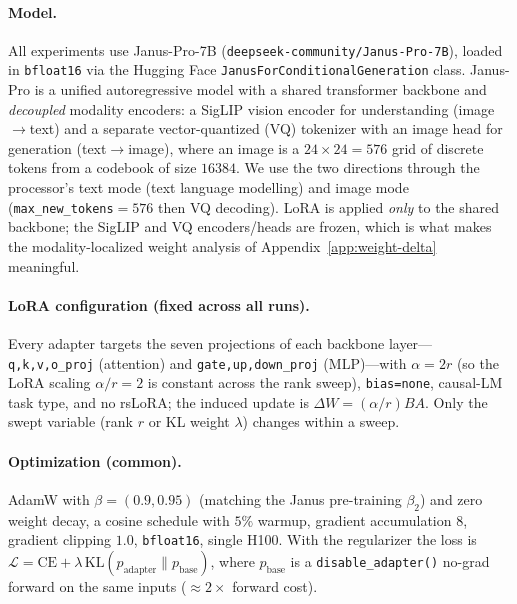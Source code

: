 \documentclass{article}
\begin{document}
\paragraph{Model.}
All experiments use Janus-Pro-7B (\texttt{deepseek-community/Janus-Pro-7B}),
loaded in \texttt{bfloat16} via the Hugging Face
\texttt{JanusForConditionalGeneration} class. Janus-Pro is a unified
autoregressive model with a shared transformer backbone and \emph{decoupled}
modality encoders: a SigLIP vision encoder for understanding (image$\to$text) and
a separate vector-quantized (VQ) tokenizer with an image head for generation
(text$\to$image), where an image is a $24\times24=576$ grid of discrete tokens
from a codebook of size $16384$. We use the two directions through the
processor's text mode (text language modelling) and image mode
(\texttt{max\_new\_tokens}$=576$ then VQ decoding). LoRA is applied \emph{only} to
the shared backbone; the SigLIP and VQ encoders/heads are frozen, which is what
makes the modality-localized weight analysis of Appendix~\ref{app:weight-delta}
meaningful.

\paragraph{LoRA configuration (fixed across all runs).}
Every adapter targets the seven projections of each backbone layer---%
\texttt{q,k,v,o\_proj} (attention) and \texttt{gate,up,down\_proj} (MLP)---with
$\alpha=2r$ (so the LoRA scaling $\alpha/r=2$ is constant across the rank sweep),
\texttt{bias=none}, causal-LM task type, and no rsLoRA; the induced update is
$\Delta W=(\alpha/r)BA$. Only the swept variable (rank $r$ or KL weight $\lambda$)
changes within a sweep.

\paragraph{Optimization (common).}
AdamW with $\beta=(0.9,0.95)$ (matching the Janus pre-training $\beta_2$) and zero
weight decay, a cosine schedule with $5\%$ warmup, gradient accumulation $8$,
gradient clipping $1.0$, \texttt{bfloat16}, single H100. With the regularizer the
loss is
$\mathcal{L}=\mathrm{CE}+\lambda\,\mathrm{KL}(p_{\text{adapter}}\|p_{\text{base}})$,
where $p_{\text{base}}$ is a \texttt{disable\_adapter()} no-grad forward on the
same inputs ($\approx$$2\times$ forward cost).
\end{document}
